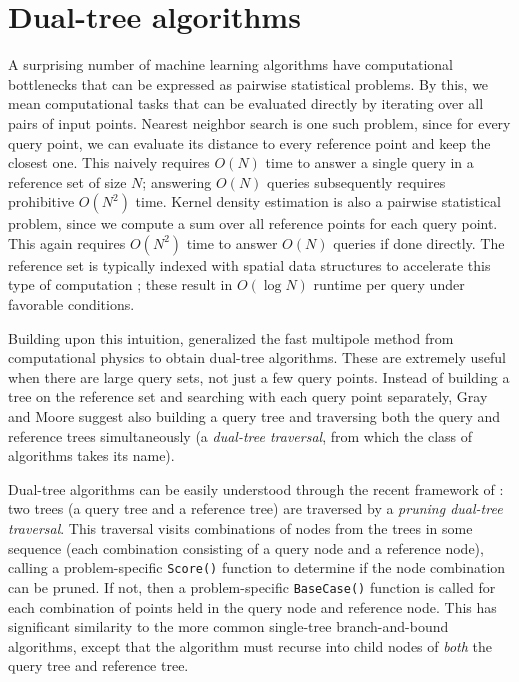 \documentclass[twoside,11pt]{article} %
\begin{document}
\section{Dual-tree algorithms}

A surprising number of machine learning algorithms have computational
bottlenecks that can be expressed as pairwise statistical problems.
By this, we mean computational tasks that can be evaluated directly by iterating over all
pairs of input points.
Nearest neighbor search is one such problem, since for every query point, we can
evaluate its distance to every reference point and keep the closest one.
This naively requires $O(N)$ time
to answer a single query in a reference set of size $N$; answering $O(N)$
queries subsequently requires prohibitive $O(N^2)$ time. Kernel density
estimation is also a pairwise statistical problem, since we compute a sum over all
reference points for each query point.
This again requires $O(N^2)$
time to answer $O(N)$ queries if done directly.
The reference set is typically indexed with
spatial data structures to accelerate this type of computation
\citep{finkel1974quad, langford2006}; these result in $O(\log N)$ runtime per
query under favorable conditions.

Building upon this intuition, \citet{nbody} generalized the fast multipole
method from computational physics to obtain dual-tree algorithms.  These are
extremely useful when there are large query sets, not just a few query points.
Instead of building a tree on the reference set and searching with each query
point separately, Gray and Moore suggest also building a query tree and
traversing both the query and reference trees simultaneously (a {\it dual-tree
traversal}, from which the class of algorithms takes its name).

Dual-tree algorithms can be easily understood through the recent framework of
\citet{curtin2013tree}: two trees (a query tree and a reference
tree) are traversed by a {\it pruning dual-tree traversal}.  This traversal
visits combinations of nodes from the trees in some sequence (each combination
consisting of a query node and a reference node), calling a problem-specific
\texttt{Score()} function to determine if the node combination can be pruned.
If not, then a problem-specific \texttt{BaseCase()} function is called for each
combination of points held in the query node and reference node.  This has
significant similarity to the more common single-tree branch-and-bound
algorithms, except that the algorithm must recurse into child nodes of {\it
both} the query tree and reference tree.
\end{document}
